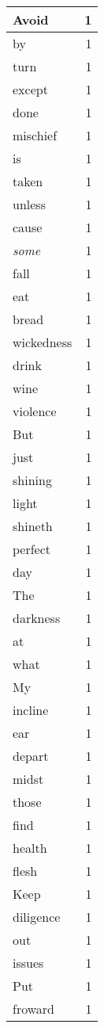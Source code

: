 \begin{center}
\begin{longtable}{l|r}
Avoid & 1\\ \hline 
by & 1\\ \hline 
turn & 1\\ \hline 
except & 1\\ \hline 
done & 1\\ \hline 
mischief & 1\\ \hline 
is & 1\\ \hline 
taken & 1\\ \hline 
unless & 1\\ \hline 
cause & 1\\ \hline 
\emph{some} & 1\\ \hline 
fall & 1\\ \hline 
eat & 1\\ \hline 
bread & 1\\ \hline 
wickedness & 1\\ \hline 
drink & 1\\ \hline 
wine & 1\\ \hline 
violence & 1\\ \hline 
But & 1\\ \hline 
just & 1\\ \hline 
shining & 1\\ \hline 
light & 1\\ \hline 
shineth & 1\\ \hline 
perfect & 1\\ \hline 
day & 1\\ \hline 
The & 1\\ \hline 
darkness & 1\\ \hline 
at & 1\\ \hline 
what & 1\\ \hline 
My & 1\\ \hline 
incline & 1\\ \hline 
ear & 1\\ \hline 
depart & 1\\ \hline 
midst & 1\\ \hline 
those & 1\\ \hline 
find & 1\\ \hline 
health & 1\\ \hline 
flesh & 1\\ \hline 
Keep & 1\\ \hline 
diligence & 1\\ \hline 
out & 1\\ \hline 
issues & 1\\ \hline 
Put & 1\\ \hline 
froward & 1\\ \hline 

\end{longtable}
\end{center}
